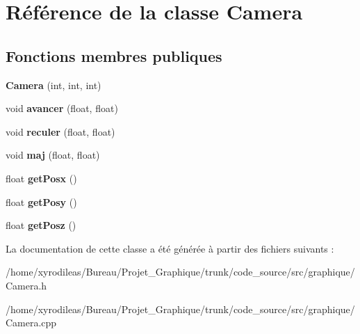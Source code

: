 \hypertarget{classCamera}{\section{Référence de la classe Camera}
\label{classCamera}
}
\subsection*{Fonctions membres publiques}
\begin{DoxyCompactItemize}
\item 
\hypertarget{classCamera_acf7c600a4689b20bfffbefa28fc04a23}{{\bfseries Camera} (int, int, int)}\label{classCamera_acf7c600a4689b20bfffbefa28fc04a23}

\item 
\hypertarget{classCamera_abc7336dba615440cc6565c09f77bd238}{void {\bfseries avancer} (float, float)}\label{classCamera_abc7336dba615440cc6565c09f77bd238}

\item 
\hypertarget{classCamera_abcdf75028bddba769241f89848d53e3f}{void {\bfseries reculer} (float, float)}\label{classCamera_abcdf75028bddba769241f89848d53e3f}

\item 
\hypertarget{classCamera_affc06966e025a837540d637177d7378c}{void {\bfseries maj} (float, float)}\label{classCamera_affc06966e025a837540d637177d7378c}

\item 
\hypertarget{classCamera_a9929a922055dda4e2e68931ca785792d}{float {\bfseries get\-Posx} ()}\label{classCamera_a9929a922055dda4e2e68931ca785792d}

\item 
\hypertarget{classCamera_a20ea0f1711dd5167b1490eca6368fdb3}{float {\bfseries get\-Posy} ()}\label{classCamera_a20ea0f1711dd5167b1490eca6368fdb3}

\item 
\hypertarget{classCamera_ae49efb8343381e6e842a36471ce47ced}{float {\bfseries get\-Posz} ()}\label{classCamera_ae49efb8343381e6e842a36471ce47ced}

\end{DoxyCompactItemize}


La documentation de cette classe a été générée à partir des fichiers suivants \-:\begin{DoxyCompactItemize}
\item 
/home/xyrodileas/\-Bureau/\-Projet\-\_\-\-Graphique/trunk/code\-\_\-source/src/graphique/Camera.\-h\item 
/home/xyrodileas/\-Bureau/\-Projet\-\_\-\-Graphique/trunk/code\-\_\-source/src/graphique/Camera.\-cpp\end{DoxyCompactItemize}
